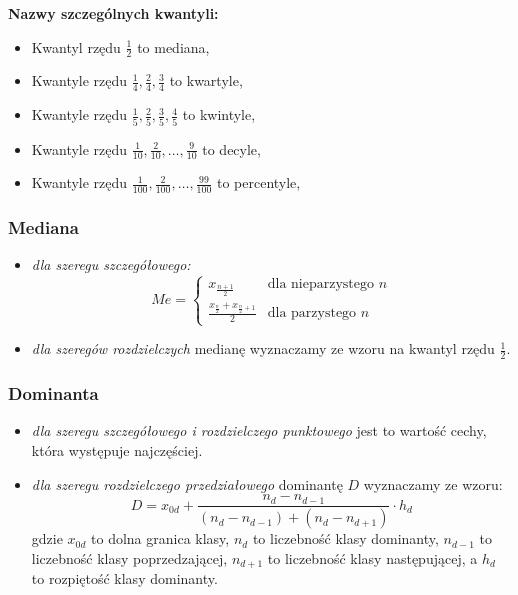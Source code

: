 \documentclass[../Matematyka.tex]{subfiles}
\begin{document}
{\bf Nazwy szczególnych kwantyli:}
\begin{itemize}
    \item Kwantyl rzędu \(\frac{1}{2}\) to mediana,
    \item Kwantyle rzędu \(\frac{1}{4}, \frac{2}{4}, \frac{3}{4}\) to kwartyle,
    \item Kwantyle rzędu \(\frac{1}{5}, \frac{2}{5}, \frac{3}{5}, \frac{4}{5}\) to kwintyle,
    \item Kwantyle rzędu \(\frac{1}{10}, \frac{2}{10}, \ldots, \frac{9}{10}\) to decyle,
    \item Kwantyle rzędu \(\frac{1}{100}, \frac{2}{100}, \ldots, \frac{99}{100}\) to percentyle,
\end{itemize}
\newpage
\subsubsection*{Mediana}
\begin{itemize}
    \item {\it dla szeregu szczegółowego:}
          \[Me =
              \begin{cases}
                  x_{\frac{n+1}{2}}                             & \text{dla nieparzystego } n \\
                  \frac{x_{\frac{n}{2}} + x_{\frac{n}{2}+1}}{2} & \text{dla parzystego } n
              \end{cases}\]
    \item {\it dla szeregów rozdzielczych} medianę wyznaczamy ze wzoru na kwantyl rzędu \(\frac{1}{2}\). 
\end{itemize}
\subsubsection*{Dominanta}
\begin{itemize}
    \item {\it dla szeregu szczegółowego i rozdzielczego punktowego} jest to wartość cechy, która występuje najczęściej.
    \item {\it dla szeregu rozdzielczego przedziałowego} dominantę \(D\) wyznaczamy ze wzoru:
    \[D = x_{0d} + \frac{n_d - n_{d-1}}{(n_d - n_{d-1}) + (n_d - n_{d+1})} \cdot h_d\]
    gdzie \(x_{0d}\) to dolna granica klasy, \(n_d\) to liczebność klasy dominanty, \(n_{d-1}\) to liczebność klasy poprzedzającej, \(n_{d+1}\) to liczebność klasy następującej, a \(h_d\) to rozpiętość klasy dominanty.
\end{itemize}
\end{document}
